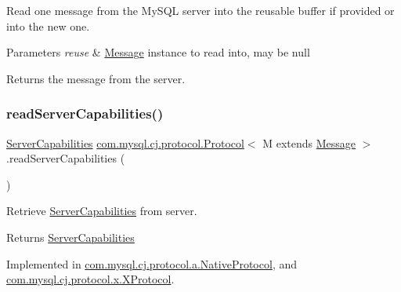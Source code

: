 Read one message from the My\+S\+QL server into the reusable buffer if provided or into the new one.


\begin{DoxyParams}{Parameters}
{\em reuse} & \mbox{\hyperlink{interfacecom_1_1mysql_1_1cj_1_1protocol_1_1_message}{Message}} instance to read into, may be null \\
\hline
\end{DoxyParams}
\begin{DoxyReturn}{Returns}
the message from the server. 
\end{DoxyReturn}
\mbox{\label{interfacecom_1_1mysql_1_1cj_1_1protocol_1_1_protocol_ac7608c87247ae3467a9f1e3e8c254042}} 
\subsubsection{\texorpdfstring{read\+Server\+Capabilities()}{readServerCapabilities()}}
{\footnotesize\ttfamily \mbox{\hyperlink{interfacecom_1_1mysql_1_1cj_1_1protocol_1_1_server_capabilities}{Server\+Capabilities}} \mbox{\hyperlink{interfacecom_1_1mysql_1_1cj_1_1protocol_1_1_protocol}{com.\+mysql.\+cj.\+protocol.\+Protocol}}$<$ M extends \mbox{\hyperlink{interfacecom_1_1mysql_1_1cj_1_1protocol_1_1_message}{Message}} $>$.read\+Server\+Capabilities (\begin{DoxyParamCaption}{ }\end{DoxyParamCaption})}

Retrieve \mbox{\hyperlink{interfacecom_1_1mysql_1_1cj_1_1protocol_1_1_server_capabilities}{Server\+Capabilities}} from server.

\begin{DoxyReturn}{Returns}
\mbox{\hyperlink{interfacecom_1_1mysql_1_1cj_1_1protocol_1_1_server_capabilities}{Server\+Capabilities}} 
\end{DoxyReturn}


Implemented in \mbox{\hyperlink{classcom_1_1mysql_1_1cj_1_1protocol_1_1a_1_1_native_protocol_acfce17a81631146efc0ca8d9cef22880}{com.\+mysql.\+cj.\+protocol.\+a.\+Native\+Protocol}}, and \mbox{\hyperlink{classcom_1_1mysql_1_1cj_1_1protocol_1_1x_1_1_x_protocol_ade4f8f02c047acca33185b6460027ddb}{com.\+mysql.\+cj.\+protocol.\+x.\+X\+Protocol}}.

